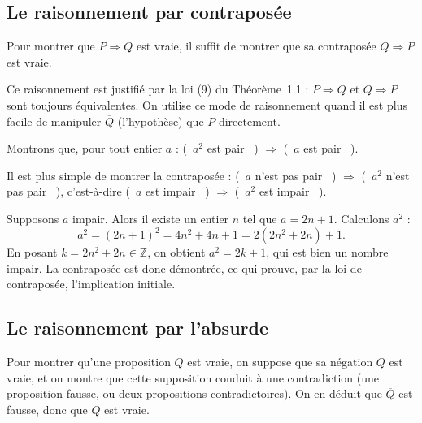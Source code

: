 \documentclass[a4paper,12pt,openany]{book}
\providecommand{\og}{\guillemotleft~}
\providecommand{\fg}{\ifhmode~\fi\guillemotright}
\begin{document}
\subsection{Le raisonnement par contraposée}

\begin{proposition}[Principe]
Pour montrer que $P\Rightarrow Q$ est vraie, il suffit de montrer que sa
contraposée $\overline{Q}\Rightarrow \overline{P}$ est vraie.
\end{proposition}

Ce raisonnement est justifié par la loi (9) du Théorème~1.1 : $P\Rightarrow Q$
et $\overline{Q}\Rightarrow\overline{P}$ sont toujours équivalentes. On
utilise ce mode de raisonnement quand il est plus facile de manipuler
$\overline{Q}$ (l'hypothèse) que $P$ directement.

\begin{exemple}
Montrons que, pour tout entier $a$ : (\og $a^2$ est pair \fg) $\Rightarrow$
(\og $a$ est pair \fg).

Il est plus simple de montrer la contraposée : (\og $a$ n'est pas pair \fg)
$\Rightarrow$ (\og $a^2$ n'est pas pair \fg), c'est-à-dire (\og $a$ est
impair \fg) $\Rightarrow$ (\og $a^2$ est impair \fg).

Supposons $a$ impair. Alors il existe un entier $n$ tel que $a=2n+1$. Calculons
$a^2$ :
\[
a^2 = (2n+1)^2 = 4n^2+4n+1 = 2(2n^2+2n)+1.
\]
En posant $k=2n^2+2n\in\mathbb{Z}$, on obtient $a^2=2k+1$, qui est bien un
nombre impair. La contraposée est donc démontrée, ce qui prouve, par la loi de
contraposée, l'implication initiale.
\end{exemple}

\subsection{Le raisonnement par l'absurde}

\begin{proposition}[Principe]
Pour montrer qu'une proposition $Q$ est vraie, on suppose que sa négation
$\overline{Q}$ est vraie, et on montre que cette supposition conduit à une
contradiction (une proposition fausse, ou deux propositions contradictoires).
On en déduit que $\overline{Q}$ est fausse, donc que $Q$ est vraie.
\end{proposition}
\end{document}
